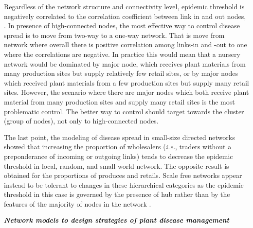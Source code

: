 \documentclass[12pt, oneside]{report}
\begin{document}

Regardless of the network structure and connectivity level, epidemic threshold is negatively correlated to the correlation coefficient between link in and out nodes, \citep{Moslonka2008}. In presence of high-connected nodes, the most effective way to control disease spread is to move from two-way to a one-way network. That is move from network where overall there is positive correlation among links-in and -out to one where the correlations are negative. In practice this would mean that a nursery network would be dominated by major node, which receives plant materials from many production sites but supply relatively few retail sites, or by major nodes which received plant materials from a few production sites but supply many retail sites. However, the scenario where there are major nodes which both receive plant material from many production sites and supply many retail sites is the most problematic control. The better way to control should target towards the cluster (group of nodes), not only to high-connected nodes. 

The last point, the modeling of disease spread in small-size directed networks showed that increasing the proportion of wholesalers (\textit{i.e.}, traders without a preponderance of incoming or outgoing links) tends to decrease the epidemic threshold in local, random, and small-world network. The opposite result is obtained for the proportions of produces and retails. Scale free networks appear instead to be tolerant to changes in these hierarchical categories as the epidemic threshold in this case is governed by the presence of hub rather than by the features of the majority of nodes in the network \citep{Moslonka2010}.

\textit{\textbf{Network models to design strategies of plant disease management}}
\end{document}
